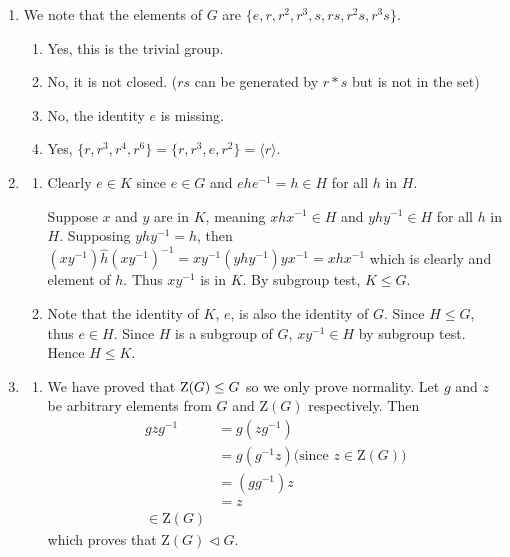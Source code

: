 \begin{enumerate}
    \item We note that the elements of $G$ are $\{e, r, r^2, r^3, s, rs, r^2s, r^3s\}$.
    \begin{enumerate}[label=(\alph*)]
        \item Yes, this is the trivial group.
        \item No, it is not closed. ($rs$ can be generated by $r \ast s$ but is not in the set)
        \item No, the identity $e$ is missing.
        \item Yes, $\{r, r^3, r^4, r^6\} = \{r, r^3, e, r^2\} = \langle r \rangle$.
    \end{enumerate}

    \item \begin{enumerate}[label=(\alph*)]
        \item Clearly $e \in K$ since $e \in G$ and $ehe^{-1} = h \in H$ for all $h$ in $H$.

        Suppose $x$ and $y$ are in $K$, meaning $xhx^{-1} \in H$ and $yhy^{-1} \in H$ for all $h$ in $H$. Supposing $yhy^{-1} = \hat{h}$, then $(xy^{-1})\hat{h}(xy^{-1})^{-1} = xy^{-1}\left(yhy^{-1}\right)yx^{-1} = xhx^{-1}$ which is clearly and element of $h$. Thus $xy^{-1}$ is in $K$. By subgroup test, $K \leq G$.

        \item Note that the identity of $K$, $e$, is also the identity of $G$. Since $H \leq G$, thus $e \in H$. Since $H$ is a subgroup of $G$, $xy^{-1} \in H$ by subgroup test. Hence $H \leq K$.
    \end{enumerate}

    \item \begin{enumerate}[label=(\alph*)]
        \item We have proved that $\mathrm{Z}(G) \leq G$ so we only prove normality. Let $g$ and $z$ be arbitrary elements from $G$ and $\mathrm{Z}(G)$ respectively. Then
        \begin{align*}
            gzg^{-1} &= g(zg^{-1})\\
            &= g(g^{-1}z) \text{(since }z \in \mathrm{Z}(G))\\
            &= (gg^{-1})z \\
            &= z\\
            \in \mathrm{Z}(G)
        \end{align*}
        which proves that $\mathrm{Z}(G) \lhd G$.


\end{enumerate}
\end{enumerate}
